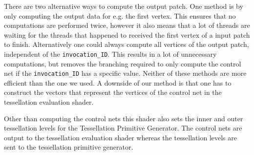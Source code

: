		There are two alternative ways to compute the output patch. One method is by only computing the output data for e.g. the first vertex. This ensures that no computations are performed twice, however it also means that a lot of threads are waiting for the threads that happened to received the first vertex of a input patch to finish.  
		Alternatively one could always compute all vertices of the output patch, independent of the \texttt{invocation\_ID}. This results in a lot of unnecessary computations, but removes the branching required to only compute the control net if the \texttt{invocation\_ID} has a specific value. Neither of these methods are more efficient than the one we used. A downside of our method is that one has to construct the vectors that represent the vertices of the control net in the tessellation evaluation shader. 

		Other than computing the control nets this shader also sets the inner and outer tessellation levels for the Tessellation Primitive Generator. 
		The control nets are output to the tessellation evaluation shader whereas the tessellation levels are sent to the tessellation primitive generator. 


